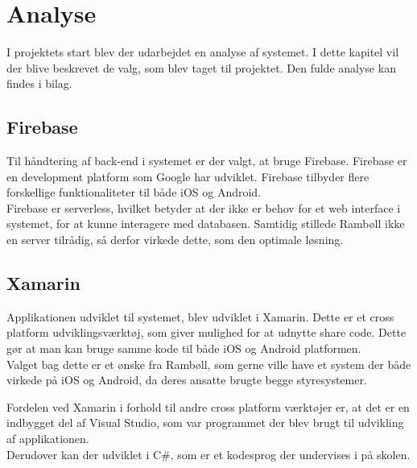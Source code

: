 \chapter{Analyse}
I projektets start blev der udarbejdet en analyse af systemet. I dette kapitel vil der blive beskrevet de valg, som blev taget til projektet. Den fulde analyse kan findes i bilag. \\

\section{Firebase}
	Til håndtering af back-end i systemet er der valgt, at bruge Firebase. Firebase\cite{Firebase} er en development platform som Google har udviklet. Firebase tilbyder flere forskellige funktionaliteter til både iOS og Android. \\
	Firebase er serverless, hvilket betyder at der ikke er behov for et web interface i systemet, for at kunne interagere med databasen. Samtidig stillede Rambøll ikke en server tilrådig, så derfor virkede dette, som den optimale løsning. \\

\section{Xamarin}
	Applikationen udviklet til systemet, blev udviklet i Xamarin\cite{Xarmain}. Dette er et cross platform udviklingsværktøj, som giver mulighed for at udnytte share code. Dette gør at man kan bruge samme kode til både iOS og Android platformen. \\
	Valget bag dette er et ønske fra Rambøll, som gerne ville have et system der både virkede på iOS og Android, da deres ansatte brugte begge styresystemer.
	
	Fordelen ved Xamarin i forhold til andre cross platform værktøjer er, at det er en indbygget del af Visual Studio, som var programmet der blev brugt til udvikling af applikationen. \\
	Derudover kan der udviklet i C\#, som er et kodesprog der undervises i på skolen.